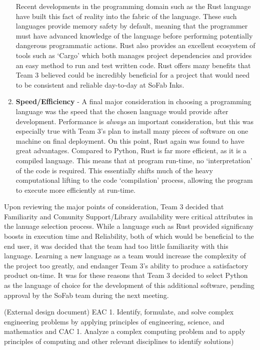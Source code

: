\documentclass{article}
\begin{document}
\begin{enumerate}
        Recent developments in the programming domain such as the Rust language have built 
        this fact of reality into the fabric of the language. These such languages provide memory safety by default, meaning that the 
        programmer must have advanced knowledge of the language before performing potentially dangerous programmatic actions. Rust also 
        provides an excellent ecosystem of tools such as `Cargo' which both manages project dependencies and provides an easy method to
        run and test written code. Rust offers many benefits that Team 3 believed could be incredibly beneficial for a project that would 
        need to be consistent and reliable day-to-day at SoFab Inks.
    \item \textbf{Speed\slash Efficiency} - A final major consideration in choosing a programming language was the speed that the chosen
        language would provide after development. Performance is \textit{always} an important consideration, but this was  
        especially true with Team 3's plan to install many pieces of software on one machine on final deployment. On this point, Rust 
        again was found to have great advantages. Compared to Python, Rust is far more efficient, as it is 
        a compiled language. This means that at program run-time, no `interpretation' of the code is required. This essentially shifts much
        of the heavy computational lifting to the code `compilation' process, allowing the program to execute more efficiently at run-time. 
\end{enumerate}

Upon reviewing the major points of consideration, Team 3 decided that Familiarity and Comunity Support\slash Library availability were 
critical attributes in the lanuage selection process. While a language such as Rust provided significany boosts in execution time
and Reliability, both of which would be beneficial to the end user, it was decided that the team had too little familiarity with this 
language. Learning a new language as a team would increase the complexity of the project too greatly, and endanger Team 3's ability to
produce a satisfactory product on-time. It was for these reasons that Team 3 decided to select Python as the language of choice for the 
development of this additional software, pending approval by the SoFab team during the next meeting. 


(External design document) 
    EAC 1. Identify, formulate, and solve complex engineering problems by 
    applying principles of engineering, science, and mathematics and CAC 1. 
    Analyze a complex computing problem and to apply principles of computing 
    and other relevant disciplines to identify solutions) 
\end{document}
